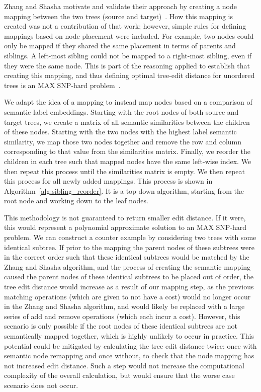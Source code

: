 Zhang and Shasha motivate and validate their approach by creating a node mapping between the two trees (source and target)~\cite{zhang_simple_1989}. How this mapping is created was not a contribution of that work; however, simple rules for defining mappings based on node placement were included. For example, two nodes could only be mapped if they shared the same placement in terms of parents and siblings. A left-most sibling could not be mapped to a right-most sibling, even if they were the same node. This is part of the reasoning applied to establish that creating this mapping, and thus defining optimal tree-edit distance for unordered trees is an MAX SNP-hard problem~\cite{zhangMAXSNPhardResults1994}.

We adapt the idea of a mapping to instead map nodes based on a comparison of semantic label embeddings. Starting with the root nodes of both source and target trees, we create a matrix of all semantic similarities between the children of these nodes. Starting with the two nodes with the highest label semantic similarity, we map those two nodes together and remove the row and column corresponding to that value from the similarities matrix. Finally, we reorder the children in each tree such that mapped nodes have the same left-wise index. We then repeat this process until the similarities matrix is empty. We then repeat this process for all newly added mappings. This process is shown in Algorithm~\ref{alg:sibling_reorder}. It is a top down algorithm, starting from the root node and working down to the leaf nodes.

This methodology is not guaranteed to return smaller edit distance. If it were, this would represent a polynomial approximate solution to an MAX SNP-hard problem. We can construct a counter example by considering two trees with some identical subtree. If prior to the mapping the parent nodes of these subtrees were in the correct order such that these identical subtrees would be matched by the Zhang and Shasha algorithm, and the process of creating the semantic mapping caused the parent nodes of these identical subtrees to be placed out of order, the tree edit distance would increase as a result of our mapping step, as the previous matching operations (which are given to not have a cost) would no longer occur in the Zhang and Shasha algorithm, and would likely be replaced with a large series of add and remove operations (which each incur a cost). However, this scenario is only possible if the root nodes of these identical subtrees are not semantically mapped together, which is highly unlikely to occur in practice. This potential could be mitigated by calculating the tree edit distance twice: once with semantic node remapping and once without, to check that the node mapping has not increased edit distance. Such a step would not increase the computational complexity of the overall calculation, but would ensure that the worse case scenario does not occur.





